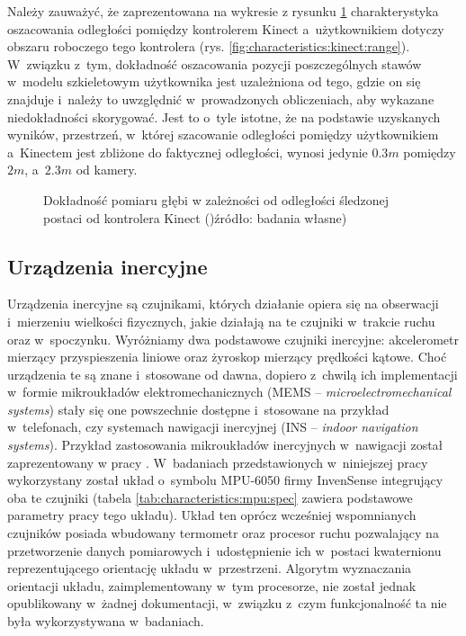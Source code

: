Należy zauważyć, że zaprezentowana na wykresie z rysunku \ref{fig:characteristics:kinect:distanceAccuracy} charakterystyka oszacowania odległości pomiędzy kontrolerem Kinect a~użytkownikiem dotyczy obszaru roboczego tego kontrolera (rys. \ref{fig:characteristics:kinect:range}). W~związku z~tym, dokładność oszacowania pozycji poszczególnych stawów w~modelu szkieletowym użytkownika jest uzależniona od tego, gdzie on się znajduje i~należy to uwzględnić w~prowadzonych obliczeniach, aby wykazane niedokładności skorygować. Jest to o~tyle istotne, że na podstawie uzyskanych wyników, przestrzeń, w~której szacowanie odległości pomiędzy użytkownikiem a~Kinectem jest zbliżone do faktycznej odległości, wynosi jedynie $0.3m$ pomiędzy $2m$, a~$2.3m$ od kamery. 																																					
																																							
\begin{savenotes}
	\begin{figure}[!htb]
		\centering
											
		\caption[Dokładność pomiaru głębi w zależności od odległości śledzonej postaci od kontrolera Kinect]{Dokładność pomiaru głębi w zależności od odległości śledzonej postaci od kontrolera Kinect ()źródło: badania własne)}
		\label{fig:characteristics:kinect:distanceAccuracy}
	\end{figure}
\end{savenotes}
																																								
\subsection{Urządzenia inercyjne}\label{sec:characteristics:imu}
																																								
Urządzenia inercyjne są czujnikami, których działanie opiera się na obserwacji i~mierzeniu wielkości fizycznych, jakie działają na te czujniki w~trakcie ruchu oraz w~spoczynku. Wyróżniamy dwa podstawowe czujniki inercyjne: akcelerometr mierzący przyspieszenia liniowe oraz żyroskop mierzący prędkości kątowe. Choć urządzenia te są znane i~stosowane od dawna, dopiero z~chwilą ich implementacji w~formie mikroukładów elektromechanicznych (MEMS -- \emph{microelectromechanical systems}) stały się one powszechnie dostępne i~stosowane na przykład w~telefonach, czy systemach nawigacji inercyjnej (INS -- \emph{indoor navigation systems}). Przykład zastosowania mikroukładów inercyjnych w~nawigacji został zaprezentowany w pracy \cite{Baranski2009, Baranski2011}. W~badaniach przedstawionych w~niniejszej pracy wykorzystany został układ o~symbolu MPU-6050 firmy InvenSense integrujący oba te czujniki (tabela \ref{tab:characteristics:mpu:spec} zawiera podstawowe parametry pracy tego układu). Układ ten oprócz wcześniej wspomnianych czujników posiada wbudowany termometr oraz procesor ruchu pozwalający na przetworzenie danych pomiarowych i~udostępnienie ich w~postaci kwaternionu reprezentującego orientację układu w~przestrzeni. Algorytm wyznaczania orientacji układu, zaimplementowany w~tym procesorze, nie został jednak opublikowany w~żadnej dokumentacji, w~związku z~czym funkcjonalność ta nie była wykorzystywana w~badaniach.
																																								
